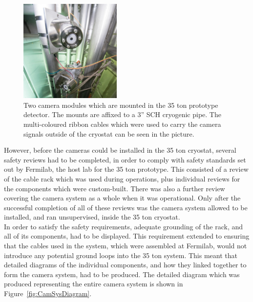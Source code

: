 \begin{figure}[h!]
  \centering
  \includegraphics[width=0.45\textwidth]{cammount35tcrop}
  \caption[Two camera modules which are mounted in the 35 ton prototype detector]
          {Two camera modules which are mounted in the 35 ton prototype detector. The mounts are affixed to a 3'' SCH cryogenic pipe. The multi-coloured ribbon cables which were used to carry the camera signals outside of the cryostat can be seen in the picture.}
  \label{fig:CamMount}
\end{figure}

However, before the cameras could be installed in the 35 ton cryostat, several safety reviews had to be completed, in order to comply with safety standards set out by Fermilab, the host lab for the 35 ton prototype. This consisted of a review of the cable rack which was used during operations, plus individual reviews for the components which were custom-built. There was also a further review covering the camera system as a whole when it was operational. Only after the successful completion of all of these reviews was the camera system allowed to be installed, and ran unsupervised, inside the 35 ton cryostat. \\

In order to satisfy the safety requirements, adequate grounding of the rack, and all of its components, had to be displayed. This requirement extended to ensuring that the cables used in the system, which were assembled at Fermilab, would not introduce any potential ground loops into the 35 ton system. This meant that detailed diagrams of the individual components, and how they linked together to form the camera system, had to be produced. The detailed diagram which was produced representing the entire camera system is shown in Figure~\ref{fig:CamSysDiagram}. \\

